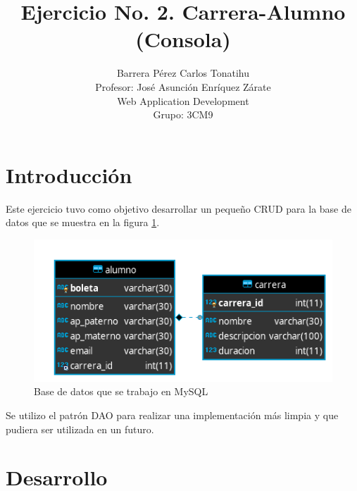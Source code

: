 \documentclass[a4paper,12pt]{article}
\title{Ejercicio No. 2. Carrera-Alumno (Consola)}
\author{Barrera Pérez Carlos Tonatihu \\ Profesor: José Asunción Enríquez 
Zárate \\ Web Application Development \\ Grupo: 3CM9 }
\begin{document}
\maketitle

\newpage
\tableofcontents
\newpage
\section{Introducción}
Este ejercicio tuvo como objetivo desarrollar un pequeño CRUD para la base de 
datos que se muestra en la figura \ref{fig:bd}.

\begin{figure}[H]
\begin{center}
 \includegraphics[width=\textwidth]{diagrama.png}
 \caption{Base de datos que se trabajo en MySQL}
 \label{fig:bd}
\end{center}
\end{figure}

Se utilizo el patrón DAO para realizar una implementación más limpia y que 
pudiera ser utilizada en un futuro.

\section{Desarrollo}
\end{document}
